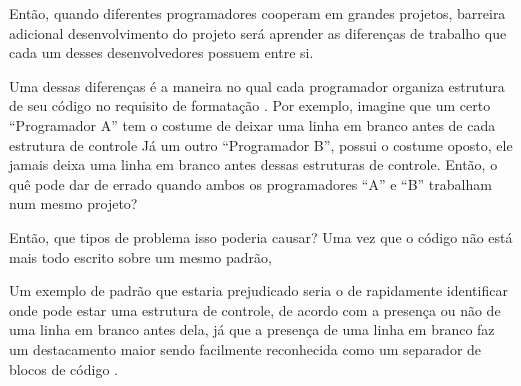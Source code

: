 {    Então,
    quando diferentes programadores cooperam em grandes projetos,
      barreira adicional  desenvolvimento do projeto será aprender as diferenças de
    trabalho que cada um desses desenvolvedores possuem entre si.

    Uma dessas diferenças é a maneira no qual cada programador organiza estrutura de seu código
    no requisito de formatação \cite{transformationForDomainSpecificOptimisation}.
    Por exemplo,
    imagine que um certo ``Programador A'' tem o costume de deixar uma linha em
    branco antes de cada estrutura de controle Já um outro ``Programador B'',
    possui o costume oposto,
    ele jamais deixa uma linha em branco antes dessas estruturas de controle.
    Então,
    o quê pode dar de errado quando ambos os programadores ``A'' e
    ``B'' trabalham num mesmo projeto?

     Então,
    que tipos de problema isso poderia causar?
    Uma vez que o código não está mais todo escrito sobre um mesmo padrão,

    Um exemplo de padrão que estaria prejudicado seria o de rapidamente identificar onde pode estar uma estrutura de controle, de acordo com a presença ou
    não de uma linha em branco antes dela,
    já que a presença de uma linha em branco faz um destacamento maior sendo facilmente reconhecida como um separador de blocos de código \cite{aPrettyGoodFormatting}.
}


